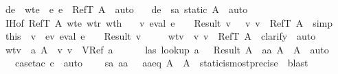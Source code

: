 \begin{isabellebody}
\ \ \isamarkupfalse \ de\ \isamarkupfalse \ wte{\isacharcolon}\ {\isachardoublequoteopen}{\isasymGamma}\ {\isasymturnstile}\isactrlisub e\ e\ {\isacharcolon}\ {\isacharparenleft}RefT\ A{\isacharparenright}{\isachardoublequoteclose}\ \isamarkupfalse \ auto\isanewline
\ \ \isamarkupfalse \ de\ \isamarkupfalse \ sa{\isacharcolon}\ {\isachardoublequoteopen}static\ A{\isachardoublequoteclose}\ \isamarkupfalse \ auto\isanewline
\ \ \isamarkupfalse \ IH{\isacharbrackleft}of\ {\isachardoublequoteopen}RefT\ A{\isachardoublequoteclose}{\isacharbrackright}\ wte\ wtr\ wth\isanewline
\ \ \isamarkupfalse \ {\isachardoublequoteopen}{\isacharparenleft}{\isasymexists}v{\isachardot}\ eval\ e\ {\isasymrho}\ {\isasymmu}\ {\isacharequal}\ Result\ v\ {\isasymand}\ {\isasymSigma}\ {\isasymturnstile}v\ v\ {\isacharcolon}\ RefT\ A{\isacharparenright}{\isachardoublequoteclose}\ \isamarkupfalse \ simp\isanewline
\ \ \isamarkupfalse \ this\ \isamarkupfalse \ v\ \ ev{\isacharcolon}\ {\isachardoublequoteopen}eval\ e\ {\isasymrho}\ {\isasymmu}\ {\isacharequal}\ Result\ v{\isachardoublequoteclose}\isanewline
\ \ \ \ \ wtv{\isacharcolon}\ {\isachardoublequoteopen}{\isasymSigma}\ {\isasymturnstile}v\ v\ {\isacharcolon}\ RefT\ A{\isachardoublequoteclose}\ \isamarkupfalse \ clarify\ \isamarkupfalse \ auto\ \isamarkupfalse \isanewline
\ \ \isamarkupfalse \ wtv\ \isamarkupfalse \ a\ A{\isacharprime}\ \ v{\isacharcolon}\ {\isachardoublequoteopen}v\ {\isacharequal}\ VRef\ a{\isachardoublequoteclose}\ \ \isanewline
\ \ \ \ las{\isacharcolon}\ {\isachardoublequoteopen}lookup\ a\ {\isasymSigma}\ {\isacharequal}\ Result\ A{\isacharprime}{\isachardoublequoteclose}\ \ aa{\isacharcolon}\ {\isachardoublequoteopen}A{\isacharprime}\ {\isasymsqsubseteq}\ A{\isachardoublequoteclose}\ \isamarkupfalse \ auto\isanewline
\ \ \ \ \isamarkupfalse \ {\isacharparenleft}case{\isacharunderscore}tac\ c{\isacharparenright}\ \isamarkupfalse \ auto\ \isamarkupfalse \isanewline
\ \ \isamarkupfalse \ sa\ aa\ \isamarkupfalse \ \ aaeq{\isacharcolon}\ {\isachardoublequoteopen}A\ {\isacharequal}\ A{\isacharprime}{\isachardoublequoteclose}\ \isamarkupfalse \ static{\isacharunderscore}is{\isacharunderscore}most{\isacharunderscore}precise\ \isamarkupfalse \ blast\isanewline

\end{isabellebody}
